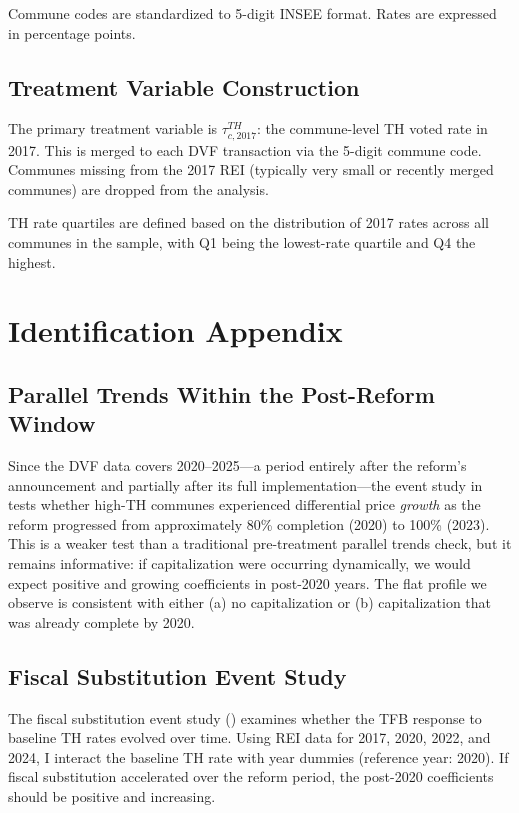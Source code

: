 \documentclass[12pt]{article}
\begin{document}
Commune codes are standardized to 5-digit INSEE format. Rates are expressed in percentage points.

\subsection{Treatment Variable Construction}

The primary treatment variable is $\tau^{TH}_{c,2017}$: the commune-level TH voted rate in 2017. This is merged to each DVF transaction via the 5-digit commune code. Communes missing from the 2017 REI (typically very small or recently merged communes) are dropped from the analysis.

TH rate quartiles are defined based on the distribution of 2017 rates across all communes in the sample, with Q1 being the lowest-rate quartile and Q4 the highest.


\section{Identification Appendix}

\subsection{Parallel Trends Within the Post-Reform Window}

Since the DVF data covers 2020--2025---a period entirely after the reform's announcement and partially after its full implementation---the event study in  tests whether high-TH communes experienced differential price \emph{growth} as the reform progressed from approximately 80\% completion (2020) to 100\% (2023). This is a weaker test than a traditional pre-treatment parallel trends check, but it remains informative: if capitalization were occurring dynamically, we would expect positive and growing coefficients in post-2020 years. The flat profile we observe is consistent with either (a) no capitalization or (b) capitalization that was already complete by 2020.

\subsection{Fiscal Substitution Event Study}

The fiscal substitution event study () examines whether the TFB response to baseline TH rates evolved over time. Using REI data for 2017, 2020, 2022, and 2024, I interact the baseline TH rate with year dummies (reference year: 2020). If fiscal substitution accelerated over the reform period, the post-2020 coefficients should be positive and increasing.
\end{document}
